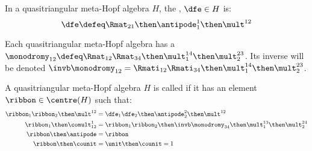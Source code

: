 \begin{definition}
        In a quasitriangular meta-Hopf algebra $H$, the ,
        $\dfe \in H$ is:
        \begin{equation}
                \dfe \defeq \Rmat_{21}\then\antipode^1_1 \then \mult^{12}
        \end{equation}
\end{definition}

\begin{definition}[monodromy]
        Each quasitriangular meta-Hopf algebra has a 
        $\monodromy_{12} \defeq
        \Rmat_{12}\Rmat_{34}\then\mult^{14}_{1}\then\mult^{23}_{2}$. Its
        inverse will be denoted
        $\invb\monodromy_{12} =
        \Rmati_{12}\Rmati_{34}\then\mult^{14}_{1}\then\mult^{23}_{2}$.
\end{definition}

\begin{definition}
        A quasitriangular meta-Hopf algebra $H$ is called  if it has an
        element $\ribbon\in \centre(H)$ such that:
        \begin{align}
                \ribbon_1\ribbon_2\then\mult^{12}
                &= \dfe_1 \dfe_2 \then \antipode^{2}_{2} \then \mult^{12}\\
                \ribbon_1 \then \comult^1_{12}
                &=      \ribbon_1\ribbon_2
                        \then\invb\monodromy_{34}
                        \then\mult^{13}_{1}
                        \then\mult^{24}_{2} \\
                \ribbon \then \antipode &= \ribbon\\
                \ribbon \then \counit &= \unit \then \counit = 1
        \end{align}
\end{definition}

